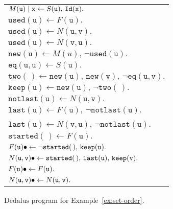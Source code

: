 \documentclass{tlp}
\newenvironment{cenchop}{\renewcommand{\arraystretch}{1.3}\begin{center}\begin{tabular}{l}}{\end{tabular}\end{center}\renewcommand{\arraystretch}{1}}
\newcommand{\qsp}{\\[1.2ex]}
\newcommand{\langname}[1]{\text{#1}}  \newcommand{\pred}[1]{\mathtt{#1}}  \newcommand{\fname}[1]{\mathit{#1}}  \newcommand{\sq}[1]{`{#1}'}
\newcommand{\dedalus}{\langname{Dedalus}}
\newcommand{\ntup}{(\,)}
\newcommand{\var}[1]{\mathtt{#1}}
\begin{document}
\begin{figure}
    \newcommand{\relused}{\pred{used}}
    \newcommand{\relnew}{\pred{new}}
    \newcommand{\reltwo}{\pred{two}}
    \newcommand{\relkeep}{\pred{keep}}
    \newcommand{\relstarted}{\pred{started}}
    \newcommand{\rellast}{\pred{last}}
    \newcommand{\relnotlast}{\pred{notlast}}
    \begin{framed}
    \begin{cenchop}        
        $M(\var u)\sugas{\var x}\gets S(\var u),\,\relid(\var x).$\qsp
        $\relused(\var u)\gets F(\var u).$\\
        $\relused(\var u)\gets N(\var u,\var v).$\\
        $\relused(\var u)\gets N(\var v,\var u).$\\
        $\relnew(\var u)\gets M(u),\,\neg\relused(\var u).$\\
        $\pred{eq}(\var u, \var u)\gets S(\var u).$\\
        $\reltwo\ntup\gets\relnew(\var u),\, \relnew(\var v),\, \neg\pred{eq}(\var u, \var v).$\\
        $\relkeep(\var u)\gets\relnew(\var u),\,\neg\reltwo\ntup.$\\
$\relnotlast(\var u)\gets N(\var u,\var v).$\\
        $\rellast(\var u)\gets F(\var u),\,\neg\relnotlast(\var u).$\\
        $\rellast(\var u)\gets N(\var v, \var u),\,\neg\relnotlast(\var u)$.
        \qsp
$\relstarted\ntup\gets F(\var u).$\\
        $F(\var u)\sugind \gets \neg\relstarted\ntup,\,\relkeep(\var u).$\\
        $N(\var u,\var v)\sugind\gets\relstarted\ntup,\,\rellast(\var u),\,\relkeep(\var v).$\\
        $F(\var u)\sugind\gets F(\var u).$\\
        $N(\var u,\var v)\sugind\gets N(\var u,\var v).$
    \end{cenchop}
    \end{framed}
    \caption{\label{fig:set-order}$\dedalus$ program
    for Example~\ref{ex:set-order}.}
\end{figure}
\end{document}
